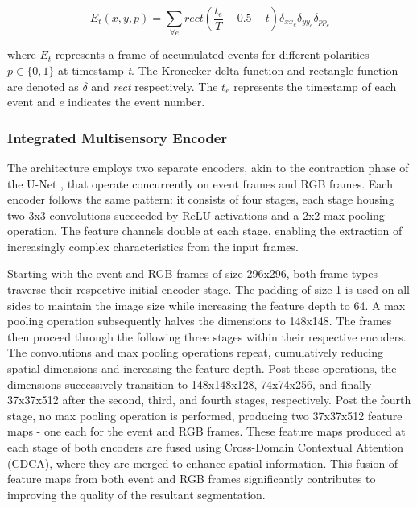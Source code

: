 \documentclass[lettersize,journal]{IEEEtran}
\begin{document}
\begin{equation}
    E_t(x,y,p) = \sum_{\forall e} rect( \frac{t_e}{T} - 0.5 - t) \delta_{xx_e} \delta_{yy_e} \delta_{pp_e}
    \label{eqn: event}
\end{equation}

where $E_t$  represents a frame of accumulated events for different polarities $p\in \{0,  1\}$ at timestamp \textit{t}. The Kronecker delta function and rectangle function are denoted as $\delta$ and \textit{rect} respectively. The $t_e$ represents the timestamp of each event and $e$ indicates the event number.





\subsubsection{\textbf{Integrated Multisensory Encoder}}
\label{subsubsection : Integrated Multi-sensory Encoder}

The architecture employs two separate encoders, akin to the contraction phase of the U-Net \cite{Lv2020AttentionSegmentation}, that operate concurrently on event frames and RGB frames. Each encoder follows the same pattern: it consists of four stages, each stage housing two 3x3 convolutions succeeded by ReLU activations and a 2x2 max pooling operation. The feature channels double at each stage, enabling the extraction of increasingly complex characteristics from the input frames.

Starting with the event and RGB frames of size 296x296, both frame types traverse their respective initial encoder stage. The padding of size 1 is used on all sides to maintain the image size while increasing the feature depth to 64. A max pooling operation subsequently halves the dimensions to 148x148. The frames then proceed through the following three stages within their respective encoders. The convolutions and max pooling operations repeat, cumulatively reducing spatial dimensions and increasing the feature depth. Post these operations, the dimensions successively transition to 148x148x128, 74x74x256, and finally 37x37x512 after the second, third, and fourth stages, respectively. Post the fourth stage, no max pooling operation is performed, producing two 37x37x512 feature maps - one each for the event and RGB frames. These feature maps produced at each stage of both encoders are fused using Cross-Domain Contextual Attention (CDCA), where they are merged to enhance spatial information. This fusion of feature maps from both event and RGB frames significantly contributes to improving the quality of the resultant segmentation.
\end{document}

